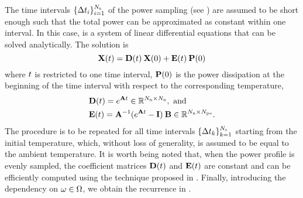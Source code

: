 The time intervals $\{ \Delta t_i \}_{i = 1}^{N_\text{s}}$ of the power sampling (see ) are assumed to be short enough such that the total power can be approximated as constant within one interval. In this case,  is a system of linear differential equations that can be solved analytically. The solution is \cite{ukhov2012}
\begin{equation} \elabel{ode-solution}
  \vX(\t) = \mCF(\t) \: \vX(0) + \mCS(\t) \: \vP(0)
\end{equation}
where $t$ is restricted to one time interval, $\mathbf{P}(0)$ is the power dissipation at the beginning of the time interval with respect to the corresponding temperature,
\begin{align*}
  & \mCF(\t) = e^{\mA \t} \in \real^{\nodes \times \nodes}, \text{ and} \\
  & \mCS(\t) = \mA^{-1} (e^{\mA \t} - \mI) \: \mB \in \real^{\nodes \times \cores}.
\end{align*}
The procedure is to be repeated for all time intervals $\{ \Delta t_k \}_{k=1}^{N_\text{s}}$ starting from the initial temperature, which, without loss of generality, is assumed to be equal to the ambient temperature. It is worth being noted that, when the power profile is evenly sampled, the coefficient matrices $\mCF(\t)$ and $\mCS(\t)$ are constant and can be efficiently computed using the technique proposed in \cite{ukhov2012}.  Finally, introducing the dependency on $\omega \in \Omega$, we obtain the recurrence in .

